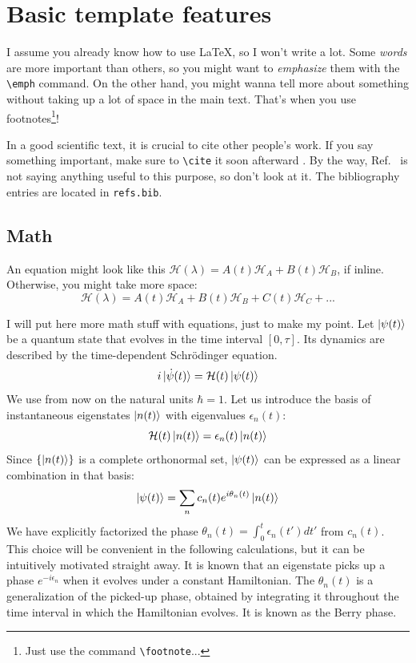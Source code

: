 
\chapter{\label{ch:feats}Basic template features}

I assume you already know how to use \LaTeX, so I won't write a lot.
Some \emph{words} are more important than others, so you might want to \emph{emphasize} them with the \texttt{\textbackslash emph} command.
On the other hand, you might wanna tell more about something without taking up a lot of space in the main text.
That's when you use footnotes\footnote{Just use the command \texttt{\textbackslash footnote}...}!

In a good scientific text, it is crucial to cite other people's work. If you say something important, make sure to \texttt{\textbackslash cite} it soon afterward \cite{10.1088/1367-2630/ad313e}. By the way, Ref.~\cite{10.1088/1367-2630/ad313e} is not saying anything useful to this purpose, so don't look at it. The bibliography entries are located in \texttt{refs.bib}.




\section{Math}

An equation might look like this $\mathcal{H}(\lambda) = A(t)\mathcal{H}_{A} + B(t)\mathcal{H}_{B}$, if inline. 
Otherwise, you might take more space:
\begin{equation*}
    \mathcal{H}(\lambda) = A(t)\mathcal{H}_{A} + B(t)\mathcal{H}_{B} + C(t)\mathcal{H}_{C} + ...
\end{equation*}

I will put here more math stuff with equations, just to make my point. Let $\ket{\psi(t)}$ be a quantum state that evolves in the time interval $[0,\tau]$. Its dynamics are described by the time-dependent Schrödinger equation.
$$i\ket{\dot\psi(t)} = \mathcal{H}(t)\ket{\psi(t)}$$
We use from now on the natural units $\hbar=1$. Let us introduce the basis of instantaneous eigenstates $\ket{n(t)}$ with eigenvalues $\epsilon_n(t)$:
\begin{equation}
    \label{eq:adth-eigenvalue}
    \mathcal{H}(t)\ket{n(t)} = \epsilon_n(t) \ket{n(t)}
\end{equation}
Since $\{\ket{n(t)}\}$ is a complete orthonormal set, $\ket{\psi(t)}$ can be expressed as a linear combination in that basis:
\begin{equation}
    \ket{\psi(t)} = \sum_n c_n(t) e^{i\theta_n(t)} \ket{n(t)}
\end{equation}
We have explicitly factorized the phase $\theta_n(t)=\int_0^t \epsilon_n(t')dt'$ from $c_n(t)$. This choice will be convenient in the following calculations, but it can be intuitively motivated straight away. 
It is known that an eigenstate picks up a phase $e^{-i\epsilon_n}$ when it evolves under a constant Hamiltonian. The $\theta_n(t)$ is a generalization of the picked-up phase, obtained by integrating it throughout the time interval in which the Hamiltonian evolves. It is known as the Berry phase.\\


